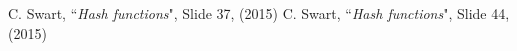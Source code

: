 \begin{thebibliography}{99}
C. Swart, ``{\it Hash functions}", Slide 37, (2015)
C. Swart, ``{\it Hash functions}", Slide 44, (2015)
\end{thebibliography}
